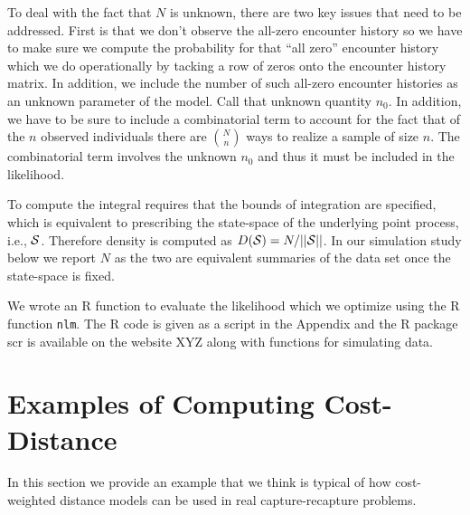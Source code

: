 \documentclass[12pt]{article}
\begin{document}
To deal with the fact that $N$ is unknown, 
there are two key issues that need to be addressed.
First is that 
we don't observe the all-zero encounter history so we have to
make sure we compute the probability for that ``all zero'' encounter history which
we do operationally by tacking a row of zeros onto the encounter history matrix. In
addition, we include the number of such all-zero encounter histories
as an unknown parameter of the model. Call that unknown quantity $n_{0}$.
In addition, we have to be sure to include a combinatorial term to
account for the fact that of the $n$ observed individuals there are
${N \choose n}$
 ways to realize a sample of size $n$. The combinatorial term
involves the unknown $n_{0}$ and thus it must be included in the likelihood.

To compute the integral requires that the bounds of integration are
specified, which is equivalent to prescribing the state-space of the
underlying point process, i.e., ${\cal S}$. Therefore density is
computed as $D({\cal S}) = N/||{\cal S}||$. In our simulation study
below we report $N$ as the two are equivalent summaries of the data
set once the state-space is fixed. 

We wrote an R function to evaluate the likelihood which we optimize
using the R function \mbox{\tt nlm}.
The R code is given as a script in the Appendix and the R package scr
is available on the website XYZ along with functions for simulating
data.


\section{Examples of Computing Cost-Distance}

In this section we provide an example that we think is typical of 
how cost-weighted distance models can be used in real
capture-recapture problems.

\end{document}
